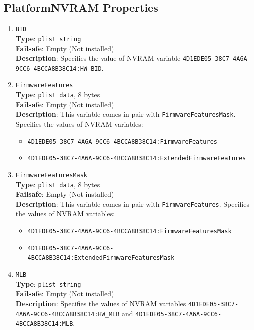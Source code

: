 \documentclass[]{article}
\providecommand{\tightlist}{%
  \setlength{\itemsep}{0pt}\setlength{\parskip}{0pt}}
\begin{document}
\subsection{PlatformNVRAM Properties}\label{platforminfonvram}

\begin{enumerate}

\item
  \texttt{BID}\\
  \textbf{Type}: \texttt{plist\ string}\\
  \textbf{Failsafe}: Empty (Not installed)\\
  \textbf{Description}: Specifies the value of NVRAM variable
  \texttt{4D1EDE05-38C7-4A6A-9CC6-4BCCA8B38C14:HW\_BID}.

\item
  \texttt{FirmwareFeatures}\\
  \textbf{Type}: \texttt{plist\ data}, 8 bytes\\
  \textbf{Failsafe}: Empty (Not installed)\\
  \textbf{Description}: This variable comes in pair with \texttt{FirmwareFeaturesMask}.
  Specifies the values of NVRAM variables:
  \begin{itemize}
  \tightlist
  \item \texttt{4D1EDE05-38C7-4A6A-9CC6-4BCCA8B38C14:FirmwareFeatures}
  \item \texttt{4D1EDE05-38C7-4A6A-9CC6-4BCCA8B38C14:ExtendedFirmwareFeatures}
  \end{itemize}

\item
  \texttt{FirmwareFeaturesMask}\\
  \textbf{Type}: \texttt{plist\ data}, 8 bytes\\
  \textbf{Failsafe}: Empty (Not installed)\\
  \textbf{Description}: This variable comes in pair with \texttt{FirmwareFeatures}.
  Specifies the values of NVRAM variables:
  \begin{itemize}
  \tightlist
  \item \texttt{4D1EDE05-38C7-4A6A-9CC6-4BCCA8B38C14:FirmwareFeaturesMask}
  \item \texttt{4D1EDE05-38C7-4A6A-9CC6-4BCCA8B38C14:ExtendedFirmwareFeaturesMask}
  \end{itemize}

\item
  \texttt{MLB}\\
  \textbf{Type}: \texttt{plist\ string}\\
  \textbf{Failsafe}: Empty (Not installed)\\
  \textbf{Description}: Specifies the values of NVRAM variables
  \texttt{4D1EDE05-38C7-4A6A-9CC6-4BCCA8B38C14:HW\_MLB} and
  \texttt{4D1EDE05-38C7-4A6A-9CC6-4BCCA8B38C14:MLB}.


\end{enumerate}
\end{document}
